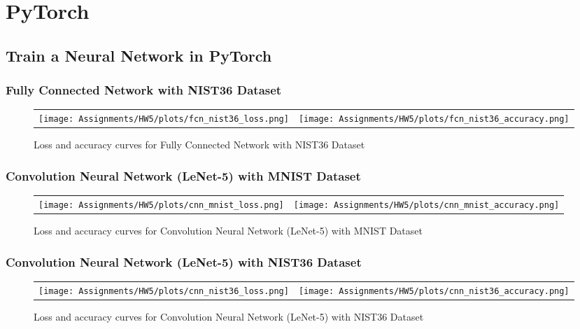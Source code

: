 \documentclass[a4paper]{article}
\begin{document}
\clearpage
\section{PyTorch}
\subsection{Train a Neural Network in PyTorch
}
\subsubsection{Fully Connected Network with NIST36 Dataset}
\begin{figure}[!ht]
\centering
\begin{tabular}{cc}
{\texttt{[image: Assignments/HW5/plots/fcn\_nist36\_loss.png]}} &
{\texttt{[image: Assignments/HW5/plots/fcn\_nist36\_accuracy.png]}}
\end{tabular}
\caption{Loss and accuracy curves for Fully Connected Network with NIST36 Dataset}
\end{figure}

\subsubsection{Convolution Neural Network (LeNet-5) with MNIST Dataset}
\begin{figure}[!ht]
\centering
\begin{tabular}{cc}
{\texttt{[image: Assignments/HW5/plots/cnn\_mnist\_loss.png]}} &
{\texttt{[image: Assignments/HW5/plots/cnn\_mnist\_accuracy.png]}}
\end{tabular}
\caption{Loss and accuracy curves for Convolution Neural Network (LeNet-5) with MNIST Dataset}
\end{figure}

\clearpage
\subsubsection{Convolution Neural Network (LeNet-5) with NIST36 Dataset}
\begin{figure}[!ht]
\centering
\begin{tabular}{cc}
{\texttt{[image: Assignments/HW5/plots/cnn\_nist36\_loss.png]}} &
{\texttt{[image: Assignments/HW5/plots/cnn\_nist36\_accuracy.png]}}
\end{tabular}
\caption{Loss and accuracy curves for Convolution Neural Network (LeNet-5) with NIST36 Dataset}
\end{figure}
\end{document}
